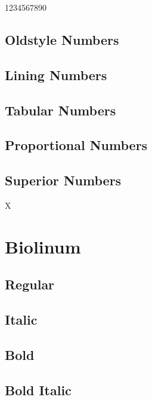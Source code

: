 \documentclass{article}
\begin{document}
1234567890

\subsection*{Oldstyle Numbers}


\subsection*{Lining Numbers}


\subsection*{Tabular Numbers}


\subsection*{Proportional Numbers}


\subsection*{Superior Numbers}

X


\clearpage
\section{Biolinum}\sf

\subsection*{Regular}
\lipsum[1]


\subsection*{Italic}
\textit{\lipsum[2]}

\subsection*{Bold}
\textbf{\lipsum[3]}

\subsection*{Bold Italic}
\end{document}
